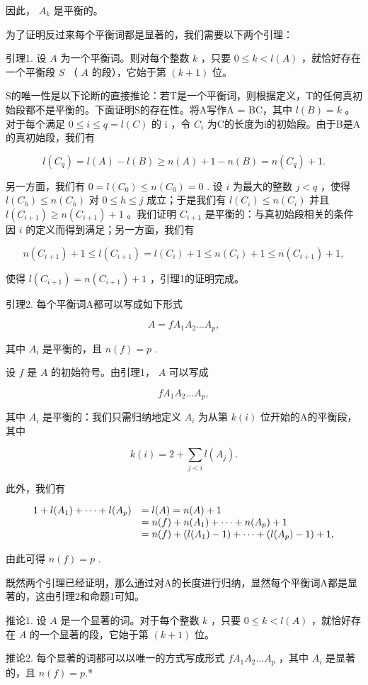 因此， \(A_{k}\) 是平衡的。

为了证明反过来每个平衡词都是显著的，我们需要以下两个引理：

引理1. 设 \(A\) 为一个平衡词。则对每个整数 \(k\) ，只要 \(0 \leqslant k < l(A)\) ，就恰好存在一个平衡段 \(S\) （ \(A\) 的段），它始于第 \((k + 1)\) 位。

S的唯一性是以下论断的直接推论：若T是一个平衡词，则根据定义，T的任何真初始段都不是平衡的。下面证明S的存在性。将A写作A = BC，其中 \(l(B) = k\) 。对于每个满足 \(0 \leqslant i \leqslant q = l(C)\) 的 i ，令 \(C_i\) 为C的长度为i的初始段。由于B是A的真初始段，我们有

\[
l (C _ {q}) = l (A) - l (B) \geqslant n (A) + 1 - n (B) = n (C _ {q}) + 1.
\]

另一方面，我们有 \(0 = l(C_0) \leqslant n(C_0) = 0\) . 设 \(i\) 为最大的整数 \(j < q\) ，使得 \(l(C_h) \leqslant n(C_h)\) 对 \(0 \leqslant h \leqslant j\) 成立；于是我们有 \(l(C_i) \leqslant n(C_i)\) 并且 \(l(C_{i+1}) \geqslant n(C_{i+1}) + 1\) 。我们证明 \(C_{i+1}\) 是平衡的：与真初始段相关的条件因 \(i\) 的定义而得到满足；另一方面，我们有

\[
n (C _ {i + 1}) + 1 \leqslant l (C _ {i + 1}) = l (C _ {i}) + 1 \leqslant n (C _ {i}) + 1 \leqslant n (C _ {i + 1}) + 1,
\]

使得 \(l(C_{i+1}) = n(C_{i+1}) + 1\) ，引理1的证明完成。

引理2. 每个平衡词A都可以写成如下形式

\[
A = f A _ {1} A _ {2} \dots A _ {p},
\]

其中 \(A_{i}\) 是平衡的，且 \(n(f) = p\) .

设 \(f\) 是 \(A\) 的初始符号。由引理1， \(A\) 可以写成

\[
f A _ {1} A _ {2} \dots A _ {p},
\]

其中 \(A_{i}\) 是平衡的：我们只需归纳地定义 \(A_{i}\) 为从第 \(k(i)\) 位开始的A的平衡段，其中

\[
k (i) = 2 + \sum_ {j <   i} l (A _ {j}).
\]

此外，我们有

\[
\begin{array}{r l} 1 + l (A _ {1}) + \dots + l (A _ {p}) & = l (A) = n (A) + 1 \\ & = n (f) + n (A _ {1}) + \dots + n (A _ {p}) + 1 \\ & = n (f) + (l (A _ {1}) - 1) + \dots + (l (A _ {p}) - 1) + 1, \end{array}
\]

由此可得 \(n(f) = p\) .

既然两个引理已经证明，那么通过对A的长度进行归纳，显然每个平衡词A都是显著的，这由引理2和命题1可知。

推论1. 设 \(A\) 是一个显著的词。对于每个整数 \(k\) ，只要 \(0 \leqslant k < l(A)\) ，就恰好存在 \(A\) 的一个显著的段，它始于第 \((k + 1)\) 位。

推论2. 每个显著的词都可以以唯一的方式写成形式 \(fA_{1}A_{2}\ldots A_{p}\) ，其中 \(A_{i}\) 是显著的，且 \(n(f) = p\).*

